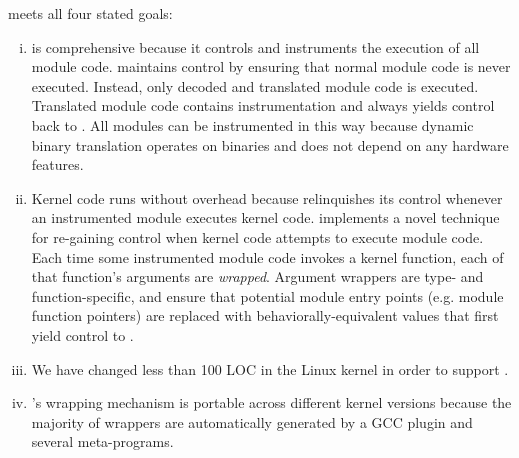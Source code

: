 \documentclass[10pt,preprint,nocopyrightspace]{sigplanconf}
\begin{document}
{\Sysname} meets all four stated goals:
\begin{enumerate}[i)]
	\item {\Sysname} is comprehensive because it controls and instruments the execution of all module code. {\Sysname} maintains control by ensuring that normal module code is never executed. Instead, only decoded and translated module code is executed. Translated module code contains instrumentation and always yields control back to {\sysname}. All modules can be instrumented in this way because dynamic binary translation operates on binaries and does not depend on any hardware features.
	\item Kernel code runs without overhead because {\sysname} relinquishes its control whenever an instrumented module executes kernel code. {\Sysname} implements a novel technique for re-gaining control when kernel code attempts to execute module code. Each time some instrumented module code invokes a kernel function, each of that function's arguments are \emph{wrapped}. Argument wrappers are type- and function-specific, and ensure that potential module entry points (e.g. module function pointers) are replaced with behaviorally-equivalent values that first yield control to {\sysname}.
	\item We have changed less than 100 LOC in the Linux kernel in order to support {\sysname}.
	\item {\Sysname}'s wrapping mechanism is portable across different kernel versions because the majority of wrappers are automatically generated by a GCC plugin and several meta-programs.
\end{enumerate}




\end{document}
